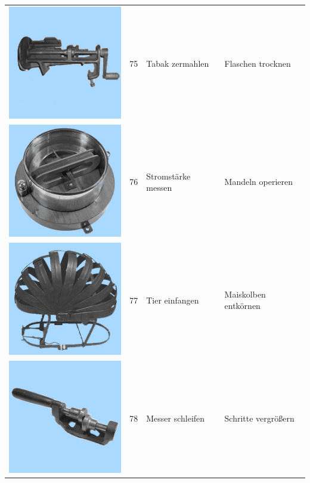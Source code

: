 \documentclass[
  english,
  man,floatsintext]{apa7}
\begin{document}
\begin{center}
\begin{ThreePartTable}
\begin{longtable}{llll}
\includegraphics[valign=c, scale=0.19]{../materials/unfamiliar/75.png} & 75 & Tabak zermahlen & Flaschen trocknen\\
\includegraphics[valign=c, scale=0.19]{../materials/unfamiliar/76.png} & 76 & Stromstärke messen & Mandeln operieren\\
\includegraphics[valign=c, scale=0.19]{../materials/unfamiliar/77.png} & 77 & Tier einfangen & Maiskolben entkörnen\\
\includegraphics[valign=c, scale=0.19]{../materials/unfamiliar/78.png} & 78 & Messer schleifen & Schritte vergrößern\\

\end{longtable}
\end{ThreePartTable}
\end{center}
\end{document}
